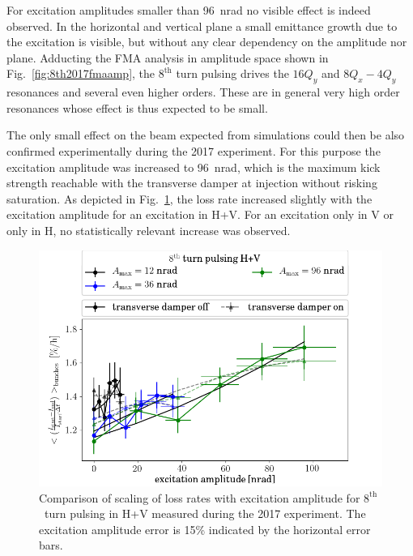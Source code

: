 \documentclass[%
 reprint,
 amsmath,amssymb,
 aps,
prstab,
]{revtex4-1}
\begin{document}
For excitation amplitudes smaller than 96~nrad no visible effect is indeed observed. In the horizontal and vertical plane a small emittance growth due to the excitation is visible, but without any clear dependency on the amplitude nor plane. Adducting the FMA analysis in amplitude space shown in Fig.~\ref{fig:8th2017fmaamp}, the $8^{\mathrm{th}}$ turn pulsing drives the $16Q_y$ and \mbox{$8Q_x-4Q_y$} resonances and several even higher orders. These are in general very high order resonances whose effect is thus expected to be small.

The only small effect on the beam expected from simulations could then be also confirmed experimentally during the 2017 experiment. For this purpose the excitation amplitude was increased to 96~nrad, which is the maximum kick strength reachable with the transverse damper at injection without risking saturation. As depicted in Fig.~\ref{fig:8thexploss}, the loss rate increased slightly with the excitation amplitude for an excitation in H+V. For an excitation only in V or only in H, no statistically relevant increase was observed.
\begin{figure}[h]
	\centering
	\includegraphics[width=1.0\linewidth]{2017_scale_amp_8hv_lbllong.png}
	\caption{\label{fig:8thexploss} Comparison of scaling of loss rates with excitation amplitude for $8^{\mathrm{th}}$~turn pulsing in H+V measured during the 2017 experiment. The excitation amplitude error is 15\% indicated by the horizontal error bars.}
\end{figure}
\end{document}
